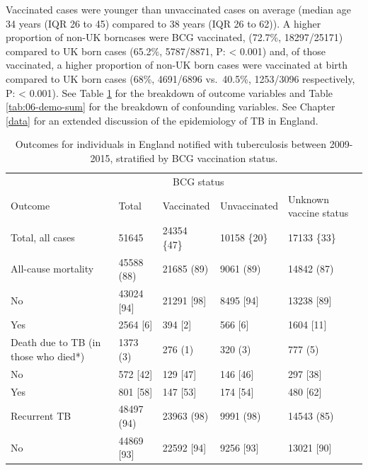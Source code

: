 \documentclass[11pt,twoside]{bristolthesis}
\begin{document}
  Vaccinated cases were younger than unvaccinated cases on average (median age 34 years (IQR 26 to 45) compared to 38 years (IQR 26 to 62)). A higher proportion of non-UK borncases were BCG vaccinated, (72.7\%, 18297/25171) compared to UK born cases (65.2\%, 5787/8871, P: \textless{} 0.001) and, of those vaccinated, a higher proportion of non-UK born cases were vaccinated at birth compared to UK born cases (68\%, 4691/6896 vs.~40.5\%, 1253/3096 respectively, P: \textless{} 0.001). See Table \ref{tab:06-outcome-sum} for the breakdown of outcome variables and Table \ref{tab:06-demo-sum} for the breakdown of confounding variables. See Chapter \ref{data} for an extended discussion of the epidemiology of TB in England.
  \begin{table}[!h]
  
  \caption{\label{tab:06-outcome-sum}Outcomes for individuals in England notified with tuberculosis between 2009-2015,  stratified by BCG vaccination status.}
  \centering
  \fontsize{8}{10}\selectfont
  \begin{tabular}{>{\raggedright\arraybackslash}p{2cm}llll}
  \toprule
  \multicolumn{2}{c}{ } & \multicolumn{3}{c}{BCG status} \\
  \cmidrule(l{3pt}r{3pt}){3-5}
  Outcome & Total & Vaccinated & Unvaccinated & Unknown vaccine status\\
  \midrule
  Total, all cases & 51645 & 24354 \{47\} & 10158 \{20\} & 17133 \{33\}\\
  All-cause mortality & 45588 (88) & 21685 (89) & 9061 (89) & 14842 (87)\\
  \hspace{1em}No & 43024 [94] & 21291 [98] & 8495 [94] & 13238 [89]\\
  \hspace{1em}Yes & 2564 [6] & 394 [2] & 566 [6] & 1604 [11]\\
  Death due to TB (in those who died*) & 1373 (3) & 276 (1) & 320 (3) & 777 (5)\\
  \addlinespace
  \hspace{1em}No & 572 [42] & 129 [47] & 146 [46] & 297 [38]\\
  \hspace{1em}Yes & 801 [58] & 147 [53] & 174 [54] & 480 [62]\\
  Recurrent TB & 48497 (94) & 23963 (98) & 9991 (98) & 14543 (85)\\
  \hspace{1em}No & 44869 [93] & 22592 [94] & 9256 [93] & 13021 [90]\\

\end{tabular}
\end{table}
\end{document}

